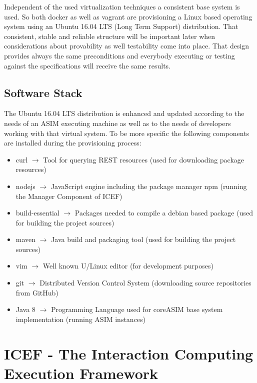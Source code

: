 Independent of the used virtualization techniques a consistent base system is used. So both docker as well as vagrant are provisioning a Linux based operating system using an Ubuntu 16.04 LTS (Long Term Support) distribution.
That consistent, stable and reliable structure will be important later when considerations about provability as well testability come into place. That design provides always the same preconditions and everybody executing or testing against the specifications will receive the same results.

\subsection{Software Stack}

The Ubuntu 16.04 LTS distribution is enhanced and updated according to the needs of an ASIM executing machine as well as to the needs of developers working with that virtual system. To be more specific the following components are installed during the provisioning process:

\begin{itemize}
	\item curl $\rightarrow$ Tool for querying REST resources (used for downloading package resources)
	\item nodejs $\rightarrow$ JavaScript engine including the package manager npm (running the Manager Component of ICEF)
	\item build-essential $\rightarrow$ Packages needed to compile a debian based package (used for building the project sources)
	\item maven $\rightarrow$ Java build and packaging tool (used for building the project sources)
	\item vim $\rightarrow$ Well known U/Linux editor (for development purposes)
	\item git $\rightarrow$ Distributed Version Control System (downloading source repositories from GitHub)
	\item Java 8 $\rightarrow$ Programming Language used for coreASIM base system implementation (running ASIM instances)
\end{itemize}




\section{ICEF - The Interaction Computing Execution Framework}
\label{sec:icef-intro}

